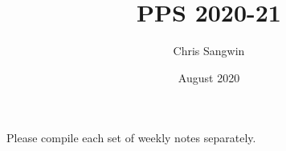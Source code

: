 \documentclass{article}
\title{PPS 2020-21}
\author{Chris Sangwin}
\date{August 2020}
\begin{document}
Please compile each set of weekly notes separately.
\end{document}
